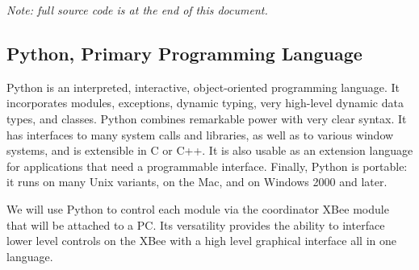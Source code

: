 	\textit{\small Note: full source code is at the end of this document.}
	\subsection{Python, Primary Programming Language}
	
	\par Python is an interpreted, interactive, object-oriented programming language. It incorporates modules, exceptions, dynamic typing, very high-level dynamic data types, and classes. Python combines remarkable power with very clear syntax. It has interfaces to many system calls and libraries, as well as to various window systems, and is extensible in C or C++. It is also usable as an extension language for applications that need a programmable interface. Finally, Python is portable: it runs on many Unix variants, on the Mac, and on Windows 2000 and later.
	\par We will use Python to control each module via the coordinator XBee module that will be attached to a PC. Its versatility provides the ability to interface lower level controls on the XBee with a high level graphical interface all in one language. 
